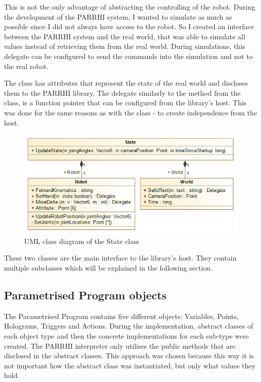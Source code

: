 This is not the only advantage of abstracting the controlling of the robot. During the development of the PARRHI system, I wanted to simulate as much as possible since I did not always have access to the robot. So I created an interface between the PARRHI system and the real world, that was able to simulate all values instead of retrieving them from the real world. During simulations, this delegate can be configured to send the commands into the simulation and not to the real robot.  

The  class has attributes that represent the state of the real world and discloses them to the PARRHI library. The  delegate similarly to the  method from the  class, is a function pointer that can be configured from the library's host. This was done for the same reasons as with the  class - to create independence from the host.

\begin{figure}[!h]
	\centering
	\includegraphics[width=0.7\linewidth]{Figures/Implementation_State}
	\caption[UML class diagram of the State class]{UML class diagram of the State class}
	\label{Fig:ImplementationState}
\end{figure}

These two classes are the main interface to the library's host. They contain multiple subclasses which will be explained in the following section.

\subsection{Parametrised Program objects}
The Parametrised Program contains five different objects: Variables, Points, Holograms, Triggers and Actions. During the implementation, abstract classes of each object type and then the concrete implementations for each sub-type were created. The PARRHI interpreter only utilises the public methods that are disclosed in the abstract classes. This approach was chosen because this way it is not important how the abstract class was instantiated, but only what values they hold.

